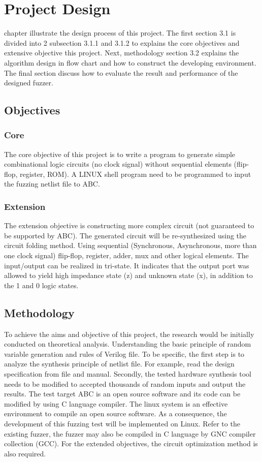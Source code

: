 \chapter{Project Design}
\renewcommand{\baselinestretch}{\mystretch}
\label{chap:ProDes}
 chapter illustrate the design process of this project. The first section 3.1 is divided into 2 subsection 3.1.1 and 3.1.2 to explains the core objectives and extensive objective this project. Next, methodology section 3.2 explains the algorithm design in flow chart and how to construct the developing environment. The final section discuss how to evaluate the result and performance of the designed fuzzer.
\section{Objectives}
\subsection{Core}
The core objective of this project is to write a program to generate simple combinational logic circuits (no clock signal) without sequential elements (flip-flop, register, ROM). A LINUX shell program need to be programmed to input the fuzzing netlist file to ABC.
\subsection{Extension}
The extension objective is constructing more complex circuit (not guaranteed to be supported by ABC). The generated circuit will be re-synthesized using the circuit folding method. Using sequential (Synchronous, Asynchronous, more than one clock signal) flip-flop, register, adder, mux and other logical elements. The input/output can be realized in tri-state. It indicates that the output port was allowed to yield high impedance state (z) and unknown state (x), in addition to the 1 and 0 logic states. 
\section{Methodology}
To achieve the aims and objective of this project, the research would be initially conducted on theoretical analysis. Understanding the basic principle of random variable generation and rules of Verilog file. To be specific, the first step is to analyze the synthesis principle of netlist file. For example, read the design specification from file and manual. Secondly, the tested hardware synthesis tool needs to be modified to accepted thousands of random inputs and output the results. The test target ABC is an open source software and its code can be modified by using C language compiler. The linux system is an effective environment to compile an open source software. As a consequence, the development of this fuzzing test will be implemented on Linux. Refer to the existing fuzzer, the fuzzer may also be compiled in C language by GNC compiler collection (GCC). For the extended objectives, the circuit optimization method is also required.

